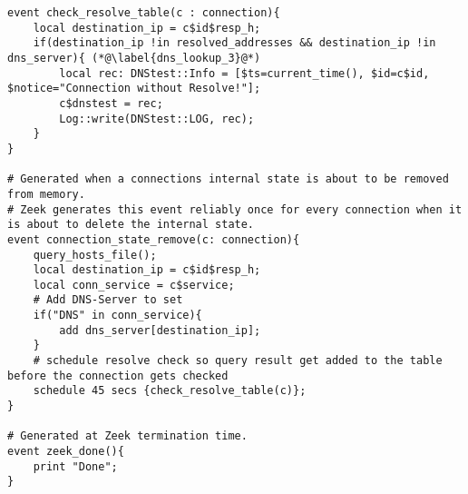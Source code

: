 \begin{lstlisting}[firstnumber=53,linerange={53-64,65-73},caption={Überprüfung der Verbindungsziele eines Endgerätes}]
event check_resolve_table(c : connection){
    local destination_ip = c$id$resp_h;
    if(destination_ip !in resolved_addresses && destination_ip !in dns_server){ (*@\label{dns_lookup_3}@*)
        local rec: DNStest::Info = [$ts=current_time(), $id=c$id, $notice="Connection without Resolve!"];
        c$dnstest = rec;
        Log::write(DNStest::LOG, rec);
    }
}

# Generated when a connections internal state is about to be removed from memory.
# Zeek generates this event reliably once for every connection when it is about to delete the internal state.
event connection_state_remove(c: connection){
    query_hosts_file();
    local destination_ip = c$id$resp_h;
    local conn_service = c$service;
    # Add DNS-Server to set
    if("DNS" in conn_service){
        add dns_server[destination_ip];
    }
    # schedule resolve check so query result get added to the table before the connection gets checked 
    schedule 45 secs {check_resolve_table(c)}; 
}

# Generated at Zeek termination time.
event zeek_done(){
    print "Done";
}
\end{lstlisting}

